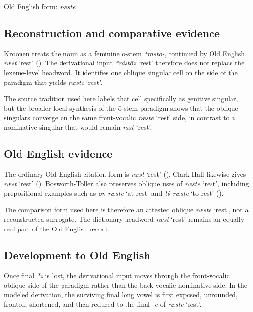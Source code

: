 \documentclass[
  british,
  a4paper,
  openany]{book}
\providecommand{\Recon}[1]{\emph{*#1}}
{\catcode`→=\active \global\def→{\ensuremath{\rightarrow}}}
\providecommand{\Recon}[1]{\emph{*#1}}
{\catcode`→=\active \global\def→{\ensuremath{\rightarrow}}}
\begin{document}
Old English form: \emph{ræste}

\subsection{Reconstruction and comparative
evidence}\label{reconstruction-and-comparative-evidence-121}

Kroonen treats the noun as a feminine ō-stem {\emph{*rastō-}}, continued
by Old English {\emph{ræst}} `rest' (). The derivational input {\Recon{rástōz} `rest'} therefore
does not replace the lexeme-level headword. It identifies one oblique
singular cell on the side of the paradigm that yields \emph{ræste}
`rest'.

The source tradition used here labels that cell specifically as genitive
singular, but the broader local synthesis of the ō-stem paradigm shows
that the oblique singulars converge on the same front-vocalic
\emph{ræste} `rest' side, in contrast to a nominative singular that
would remain \emph{rast} `rest'.

\subsection{Old English evidence}\label{old-english-evidence-121}

The ordinary Old English citation form is {\emph{ræst}} `rest'
(). Clark Hall likewise
gives {\emph{ræst}} `rest' (). Bosworth-Toller also preserves oblique uses of
{\emph{ræste}} `rest', including prepositional examples such as \emph{on
ræste} `at rest' and \emph{tó ræste} `to rest'
().

The comparison form used here is therefore an attested oblique
{\emph{ræste}} `rest', not a reconstructed surrogate. The dictionary
headword {\emph{ræst}} `rest' remains an equally real part of the Old
English record.

\subsection{Development to Old
English}\label{development-to-old-english-121}

Once final \emph{*z} is lost, the derivational input moves through the
front-vocalic oblique side of the paradigm rather than the back-vocalic
nominative side. In the modeled derivation, the surviving final long
vowel is first exposed, unrounded, fronted, shortened, and then reduced
to the final \emph{-e} of \emph{ræste} `rest'.
\end{document}
